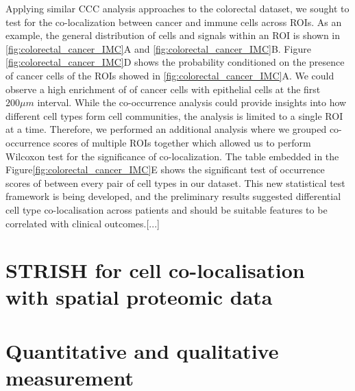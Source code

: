 Applying similar CCC analysis approaches to the colorectal dataset, we sought to test for the co-localization between cancer and immune cells across ROIs. As an example, the general distribution of cells and signals within an ROI is shown in \ref{fig:colorectal_cancer_IMC}A and \ref{fig:colorectal_cancer_IMC}B. Figure \ref{fig:colorectal_cancer_IMC}D shows the probability conditioned on the presence of cancer cells of the ROIs showed in \ref{fig:colorectal_cancer_IMC}A. We could observe a high enrichment of of cancer cells with epithelial cells at the first $200\mu m$ interval. While the co-occurrence analysis could provide insights into how different cell types form cell communities, the analysis is limited to a single ROI at a time. Therefore, we performed an additional analysis where we grouped co-occurrence scores of multiple ROIs together which allowed us to perform Wilcoxon test for the significance of co-localization. The table embedded in the Figure\ref{fig:colorectal_cancer_IMC}E shows the significant test of occurrence scores of between every pair of cell types in our dataset. This new statistical test framework is being developed, and the preliminary results suggested differential cell type co-localisation across patients and should be suitable features to be correlated with clinical outcomes.[...]




\section{STRISH for cell co-localisation with spatial proteomic data}
\label{Sec:3.3_STRISH2.0}	%



\section{Quantitative and qualitative measurement}
\label{Sec:3.4_validation}	%




